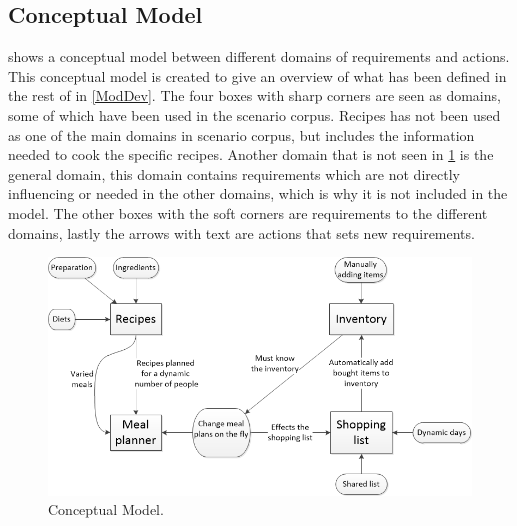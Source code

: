 \subsection{Conceptual Model} \label{ConsMod}
 shows a conceptual model between different domains of requirements and actions. This conceptual model is created to give an overview of what has been defined in the rest of  in \cref{ModDev}. The four boxes with sharp corners are seen as domains, some of which have been used in the scenario corpus. Recipes has not been used as one of the main domains in scenario corpus, but includes the information needed to cook the specific recipes. Another domain that is not seen in \cref{ConceptualModelPicture} is the general domain, this domain contains requirements which are not directly influencing or needed in the other domains, which is why it is not included in the model. The other boxes with the soft corners are requirements to the different domains, lastly the arrows with text are actions that sets new requirements.

\begin{figure}[H]
	\centering
    \includegraphics[width=1\textwidth]{Grafik/conceptualModel}
	\caption{Conceptual Model.}
	\label{ConceptualModelPicture}
\end{figure}